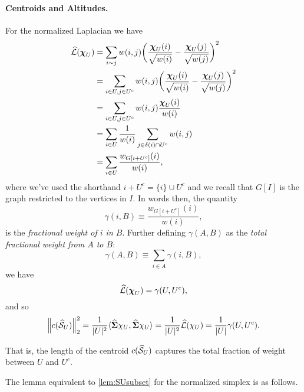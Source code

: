 \paragraph{Centroids and Altitudes.}
For the normalized Laplacian we have
\begin{align}
\widehat{\mathcal{L}}(\boldsymbol{\chi}_U)&=\sum_{i\sim j}w(i,j) \bigg(\frac{\boldsymbol{\chi}_U(i)}{\sqrt{w(i)}}-\frac{\boldsymbol{\chi}_U(j)}{\sqrt{w(j)}}\bigg)^2 \notag \\
&= \sum_{i\in U,j\in U^c}w(i,j)\bigg(\frac{\boldsymbol{\chi}_U(i)}{\sqrt{w(i)}}-\frac{\boldsymbol{\chi}_U(j)}{\sqrt{w(j)}}\bigg)^2 \notag \\
&= \sum_{i\in U,j\in U^c}w(i,j)\frac{\boldsymbol{\chi}_U(i)}{w(i)} \notag \\
&= \sum_{i\in U}\frac{1}{w(i)} \sum_{j\in \delta(i)\cap U^c}w(i,j) \notag \\
&= \sum_{i\in U}\frac{w_{G[i+U^c]}(i)}{w(i)}, \label{eq:Lnf(chiU)}
\end{align}
where we've used the shorthand $i+U^c = \{i\}\cup U^c$ and we recall that $G[I]$ is the graph restricted to the vertices in $I$. In words then, the quantity 
\[\gamma(i,B)\equiv \frac{w_{G[i+U^c]}(i)}{w(i)},\]
is the \emph{fractional weight of $i$ in $B$}. 
Further defining $\gamma(A,B)$ as the \emph{total fractional weight from $A$ to $B$}:
\[\gamma(A,B) \equiv \sum_{i\in A}\gamma(i,B), \]
we have 
\[\widehat{\mathcal{L}}(\boldsymbol{\chi}_U) = \gamma(U,U^c),\]
and so
\begin{equation}
\label{eq:c(SnU)}
\norm{c(\widehat{\mathcal{S}}_U)}_2^2 = \frac{1}{|U|^2}\langle \widehat{\boldsymbol{\Sigma}}\chi_U,\widehat{\boldsymbol{\Sigma}}\chi_U\rangle = \frac{1}{|U|^2}\widehat{\mathcal{L}}(\chi_U) = \frac{1}{|U|} \gamma(U,U^c).
\end{equation}


That is, the length of the centroid $c(\widehat{\mathcal{S}}_U)$ captures the total fraction of weight between $U$ and $U^c$. 
 
 
The lemma equivalent to \ref{lem:SUsubset} for the normalized simplex is as follows. 

